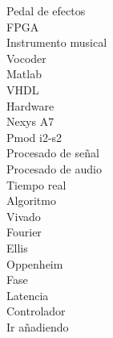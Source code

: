 \begin{multicols}{2}
\noindent Pedal de efectos \\
FPGA \\
Instrumento musical \\
Vocoder \\
Matlab \\
VHDL \\
Hardware \\
Nexys A7 \\
Pmod i2-s2 \\
Procesado de señal \\
Procesado de audio \\
Tiempo real \\
Algoritmo \\
Vivado \\
Fourier \\
Ellis \\
Oppenheim \\
Fase \\
Latencia \\
Controlador \\
Ir añadiendo \\

\end{multicols}